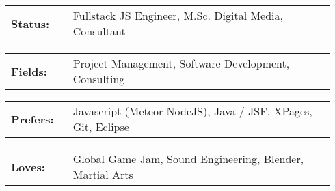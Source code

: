 \documentclass[10pt,A4]{article}
\newcommand{\tzlarrow}{(0,0) -- (0.2,0) -- (0.3,0.2) -- (0.2,0.4) -- (0,0.4) -- (0.1,0.2) -- cycle;}
\newcommand{\larrow}[1]
{\begin{tikzpicture}[scale=0.58]
	 \filldraw[fill=#1!100,draw=#1!100!black]  \tzlarrow
 \end{tikzpicture}
}
\newcommand{\metasection}[2]{
	\begin{tabular*}{1\linewidth}{p{0.18\linewidth} p{0.76\linewidth}}
		\larrow{bgcol}\normalsize{\textbf{\textcolor{sectcol}{#1}}}&#2\\
	\end{tabular*}
}
\newcommand{\spread}{7pt}
\begin{document}
\begin{minipage}[t]{0.485\textwidth}

\vspace{\spread}

\metasection{Status:}{Fullstack JS Engineer, M.Sc. Digital Media, Consultant}
\metasection{Fields:}{Project Management, Software Development, Consulting} 
\end{minipage}
\hfill
\begin{minipage}[t]{0.485\textwidth}

\vspace{5pt}

\metasection{Prefers:}{Javascript (Meteor NodeJS), Java / JSF, XPages, Git, Eclipse}
\metasection{Loves:}{Global Game Jam, Sound Engineering, Blender, Martial Arts}
\end{minipage}
\end{document}
